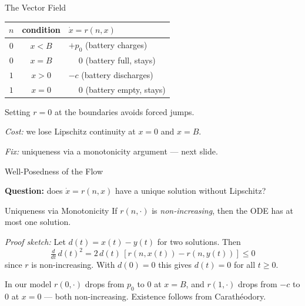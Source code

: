\documentclass[aspectratio=169]{beamer}
\begin{document}
\begin{frame}{The Vector Field}

  \begin{center}
  \renewcommand{\arraystretch}{1.5}
  \begin{tabular}{ccl}
    \toprule
    $n$ & condition & $\dot{x} = r(n,x)$ \\
    \midrule
    $0$ & $x < B$ & $+p_0$ \quad (battery charges) \\
    $0$ & $x = B$ & $\phantom{+}0$ \quad (battery full, stays) \\
    $1$ & $x > 0$ & $-c$ \quad (battery discharges) \\
    $1$ & $x = 0$ & $\phantom{+}0$ \quad (battery empty, stays) \\
    \bottomrule
  \end{tabular}
  \end{center}

  \bigskip
  Setting $r=0$ at the boundaries avoids forced jumps.

  \medskip
  \textit{Cost:} we lose Lipschitz continuity at $x=0$ and $x=B$.

  \medskip
  \textit{Fix:} uniqueness via a monotonicity argument — next slide.

\end{frame}

\begin{frame}{Well-Posedness of the Flow}

  \textbf{Question:} does $\dot{x} = r(n,x)$ have a unique solution without Lipschitz?

  \bigskip
  \begin{block}{Uniqueness via Monotonicity}
    If $r(n,\cdot)$ is \emph{non-increasing}, then the ODE has at most one solution.
    \medskip

    \textit{Proof sketch:} Let $d(t) = x(t) - y(t)$ for two solutions. Then
    \[
      \tfrac{d}{dt}\, d(t)^2 = 2\,d(t)\,[r(n,x(t)) - r(n,y(t))] \leq 0
    \]
    since $r$ is non-increasing. With $d(0)=0$ this gives $d(t)=0$ for all $t\geq 0$.
  \end{block}

  \bigskip
  In our model $r(0,\cdot)$ drops from $p_0$ to $0$ at $x=B$, and $r(1,\cdot)$ drops from $-c$ to $0$ at $x=0$ — both non-increasing. Existence follows from Carathéodory.

\end{frame}
\end{document}
